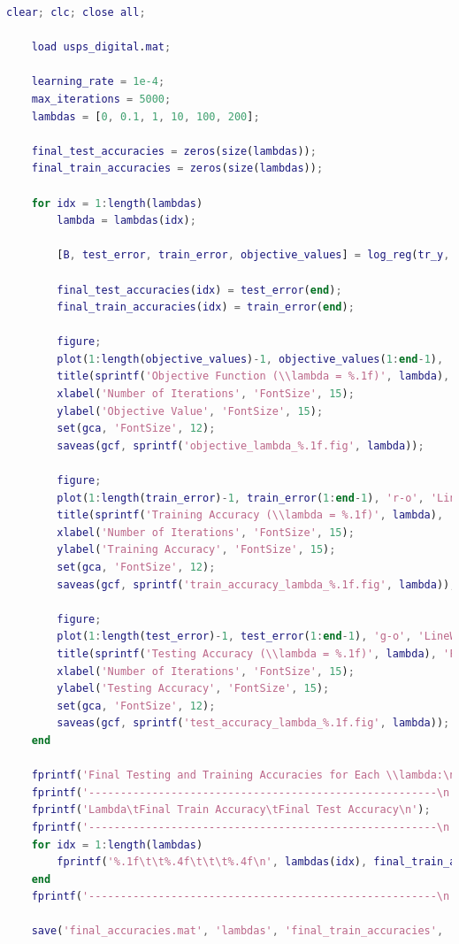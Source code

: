 \documentclass[11pt]{article}
\begin{document}
\begin{lstlisting}[language = matlab]
	clear; clc; close all;

	load usps_digital.mat;
	
	learning_rate = 1e-4;   
	max_iterations = 5000;  
	lambdas = [0, 0.1, 1, 10, 100, 200]; 
	
	final_test_accuracies = zeros(size(lambdas));
	final_train_accuracies = zeros(size(lambdas));
	
	for idx = 1:length(lambdas)
		lambda = lambdas(idx); 
		
		[B, test_error, train_error, objective_values] = log_reg(tr_y, tr_X, te_y, te_X, lambda, learning_rate);
		
		final_test_accuracies(idx) = test_error(end);
		final_train_accuracies(idx) = train_error(end);
		
		figure;
		plot(1:length(objective_values)-1, objective_values(1:end-1), 'b-o', 'LineWidth', 1, 'MarkerSize', 1);
		title(sprintf('Objective Function (\\lambda = %.1f)', lambda), 'FontSize', 15);
		xlabel('Number of Iterations', 'FontSize', 15);
		ylabel('Objective Value', 'FontSize', 15);
		set(gca, 'FontSize', 12);
		saveas(gcf, sprintf('objective_lambda_%.1f.fig', lambda));
		
		figure;
		plot(1:length(train_error)-1, train_error(1:end-1), 'r-o', 'LineWidth', 1, 'MarkerSize', 1);
		title(sprintf('Training Accuracy (\\lambda = %.1f)', lambda), 'FontSize', 15);
		xlabel('Number of Iterations', 'FontSize', 15);
		ylabel('Training Accuracy', 'FontSize', 15);
		set(gca, 'FontSize', 12);
		saveas(gcf, sprintf('train_accuracy_lambda_%.1f.fig', lambda));
		
		figure;
		plot(1:length(test_error)-1, test_error(1:end-1), 'g-o', 'LineWidth', 1, 'MarkerSize', 1);
		title(sprintf('Testing Accuracy (\\lambda = %.1f)', lambda), 'FontSize', 15);
		xlabel('Number of Iterations', 'FontSize', 15);
		ylabel('Testing Accuracy', 'FontSize', 15);
		set(gca, 'FontSize', 12);
		saveas(gcf, sprintf('test_accuracy_lambda_%.1f.fig', lambda));
	end
	
	fprintf('Final Testing and Training Accuracies for Each \\lambda:\n');
	fprintf('-------------------------------------------------------\n');
	fprintf('Lambda\tFinal Train Accuracy\tFinal Test Accuracy\n');
	fprintf('-------------------------------------------------------\n');
	for idx = 1:length(lambdas)
		fprintf('%.1f\t\t%.4f\t\t\t%.4f\n', lambdas(idx), final_train_accuracies(idx), final_test_accuracies(idx));
	end
	fprintf('-------------------------------------------------------\n');
	
	save('final_accuracies.mat', 'lambdas', 'final_train_accuracies', 'final_test_accuracies');
\end{lstlisting}
\end{document}
